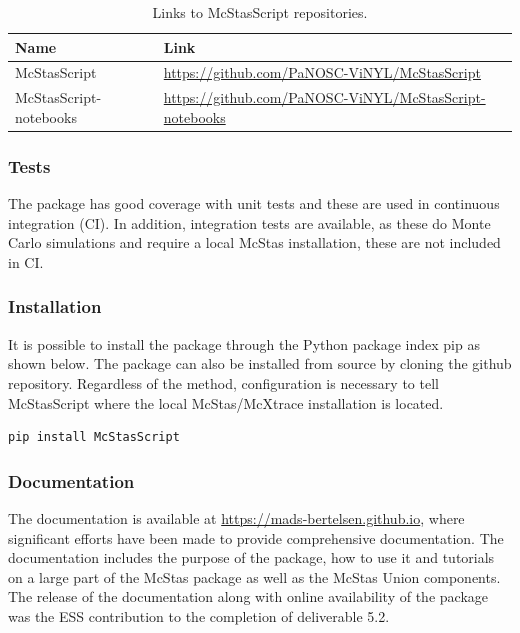 \documentclass[11pt, a4paper]{article}
\begin{document}
\begin{table}[h!!!]
\centering
\begin{tabular}{l|l}
Name & Link \\\hline
McStasScript & \href{https://github.com/PaNOSC-ViNYL/McStasScript}{https://github.com/PaNOSC-ViNYL/McStasScript} \\
McStasScript-notebooks &  \href{https://github.com/PaNOSC-ViNYL/McStasScript-notebooks}{https://github.com/PaNOSC-ViNYL/McStasScript-notebooks}
\end{tabular}
\caption{\label{tab:links} Links to McStasScript repositories.}
\end{table}

\subsubsection{Tests}
The package has good coverage with unit tests and these are used in continuous integration (CI). In addition, integration tests are available, as these do Monte Carlo simulations and require a local McStas installation, these are not included in CI.

\subsubsection{Installation}
It is possible to install the package through the Python package index pip as shown below. The package can also be installed from source by cloning the github repository. Regardless of the method, configuration is necessary to tell McStasScript where the local McStas/McXtrace installation is located.

\begin{verbatim}
pip install McStasScript
\end{verbatim}

\subsubsection{Documentation}
The documentation is available at \href{https://mads-bertelsen.github.io}{https://mads-bertelsen.github.io}, where significant efforts have been made to provide comprehensive documentation. The documentation includes the purpose of the package, how to use it and tutorials on a large part of the McStas package as well as the McStas Union components. The release of the documentation along with online availability of the package was the ESS contribution to the completion of deliverable 5.2.
\end{document}
